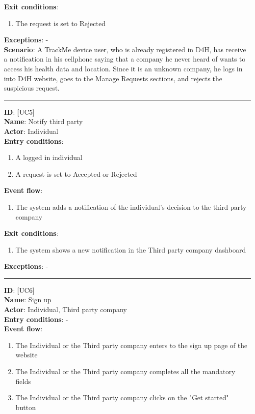 \documentclass[hidelinks, 12pt]{report}
\newcommand\usecase[1]{ [UC#1] }
\begin{document}
\begin{itemize}
\begin{enumerate}
		\end{enumerate}
		\textbf{Exit conditions}:
		\begin{enumerate}
			\item{The request is set to Rejected}
		\end{enumerate}
		\textbf{Exceptions}: - \\
		\textbf{Scenario}: A TrackMe device user, who is already registered in D4H, has receive a notification in his cellphone saying that a company he never heard of wants to access his health data and location. Since it is an unknown company, he logs in into D4H website, goes to the Manage Requests sections, and rejects the suspicious request. \\
		\rule{\linewidth}{0.4pt}
		\textbf{ID}: \usecase{5} \\
		\textbf{Name}: Notify third party \\
		\textbf{Actor}: Individual \\
		\textbf{Entry conditions}:
		\begin{enumerate}
			\item{A logged in individual}
			\item{A request is set to Accepted or Rejected}
		\end{enumerate}
		\textbf{Event flow}:
		\begin{enumerate}
			\item{The system adds a notification of the individual's decision to the third party company}
		\end{enumerate}
		\textbf{Exit conditions}:
		\begin{enumerate}
			\item{The system shows a new notification in the Third party company dashboard}
		\end{enumerate}
		\textbf{Exceptions}: - \\
		\rule{\linewidth}{0.4pt}
		\textbf{ID}: \usecase{6} \\
		\textbf{Name}: Sign up \\
		\textbf{Actor}: Individual, Third party company \\
		\textbf{Entry conditions}: - \\
		\textbf{Event flow}:
		\begin{enumerate}
			\item{The Individual or the Third party company enters to the sign up page of the website}
			\item{The Individual or the Third party company completes all the mandatory fields}
			\item{The Individual or the Third party company clicks on the "Get started" button}

\end{enumerate}
\end{itemize}
\end{document}
